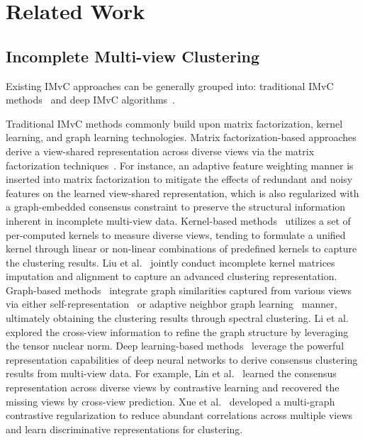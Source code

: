 \section{Related Work}
\label{sec:sec2}

\subsection{Incomplete Multi-view Clustering}

Existing IMvC approaches can be generally grouped into: traditional IMvC methods~\cite{wen2020adaptive, yin2021incomplete, wang2022highly} and deep IMvC algorithms~\cite{yang2022robust, xu2024deep, yan2024deep}. 

Traditional IMvC methods commonly build upon matrix factorization, kernel learning, and graph learning technologies. Matrix factorization-based approaches derive a view-shared representation across diverse views via the matrix factorization techniques~\cite{hu2019one, wen2023graph, khan2024weighted}. For instance, an adaptive feature weighting manner is inserted into matrix factorization to mitigate the effects of redundant and noisy features on the learned view-shared representation, which is also regularized with a graph-embedded consensus constraint to preserve the structural information inherent in incomplete multi-view data. Kernel-based methods~\cite{9556554, LI2024102086} utilizes a set of per-computed kernels to measure diverse views, tending to formulate a unified kernel through linear or non-linear combinations of predefined kernels to capture the clustering results. Liu et al.~\cite{9556554} jointly conduct incomplete kernel matrices imputation and alignment to capture an advanced clustering representation. Graph-based methods~\cite{yang2024geometric, du2024fast, li2022refining} integrate graph similarities captured from various views via either self-representation~\cite{elhamifar2013sparse} or adaptive neighbor graph learning~\cite{nie2014clustering} manner, ultimately obtaining the clustering results through spectral clustering. Li et al.~\cite{li2022refining} explored the cross-view information to refine the graph structure by leveraging the tensor nuclear norm. Deep learning-based methods~\cite{wen2020dimc, xu2022deep, li2023incomplete} leverage the powerful representation capabilities of deep neural networks to derive consensus clustering results from multi-view data. For example, Lin et al.~\cite{lin2021completer} learned the consensus representation across diverse views by contrastive learning and recovered the missing views by cross-view prediction. Xue et al.~\cite{xue2024robust} developed a multi-graph contrastive regularization to reduce abundant correlations
across multiple views and learn discriminative representations for clustering. 

